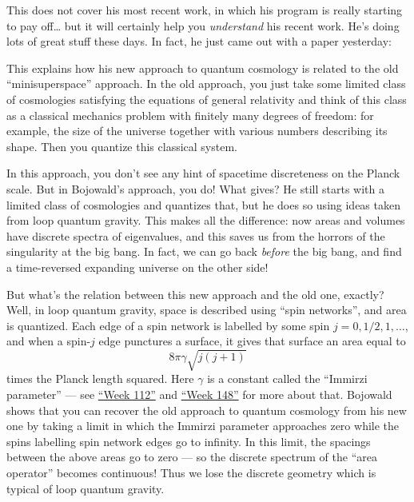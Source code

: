 \documentclass{article}
\def\tightlist{}
\renewcommand{\texttt}[1]{%
  \begingroup
  \ttfamily
  \begingroup\lccode`~=`/\lowercase{\endgroup\def~}{/\discretionary{}{}{}}%
  \begingroup\lccode`~=`[\lowercase{\endgroup\def~}{[\discretionary{}{}{}}%
  \begingroup\lccode`~=`.\lowercase{\endgroup\def~}{.\discretionary{}{}{}}%
  \catcode`/=\active\catcode`[=\active\catcode`.=\active
  \scantokens{#1\noexpand}%
  \endgroup
}
\begin{document}

This does not cover his most recent work, in which his program is really
starting to pay off\ldots{} but it will certainly help you
\emph{understand} his recent work. He's doing lots of great stuff these
days. In fact, he just came out with a paper yesterday:


This explains how his new approach to quantum cosmology is related to
the old ``minisuperspace'' approach. In the old approach, you just take
some limited class of cosmologies satisfying the equations of general
relativity and think of this class as a classical mechanics problem with
finitely many degrees of freedom: for example, the size of the universe
together with various numbers describing its shape. Then you quantize
this classical system.

In this approach, you don't see any hint of spacetime discreteness on
the Planck scale. But in Bojowald's approach, you do! What gives? He
still starts with a limited class of cosmologies and quantizes that, but
he does so using ideas taken from loop quantum gravity. This makes all
the difference: now areas and volumes have discrete spectra of
eigenvalues, and this saves us from the horrors of the singularity at
the big bang. In fact, we can go back \emph{before} the big bang, and
find a time-reversed expanding universe on the other side!

But what's the relation between this new approach and the old one,
exactly? Well, in loop quantum gravity, space is described using ``spin
networks'', and area is quantized. Each edge of a spin network is
labelled by some spin \(j = 0, 1/2, 1, \ldots\), and when a spin-\(j\)
edge punctures a surface, it gives that surface an area equal to
\[8\pi\gamma\sqrt{j(j+1)}\] times the Planck length squared. Here
\(\gamma\) is a constant called the ``Immirzi parameter'' --- see
\protect\hyperlink{week112}{``Week 112''} and
\protect\hyperlink{week148}{``Week 148''} for more about that. Bojowald
shows that you can recover the old approach to quantum cosmology from
his new one by taking a limit in which the Immirzi parameter approaches
zero while the spins labelling spin network edges go to infinity. In
this limit, the spacings between the above areas go to zero --- so the
discrete spectrum of the ``area operator'' becomes continuous! Thus we
lose the discrete geometry which is typical of loop quantum gravity.
\end{document}
